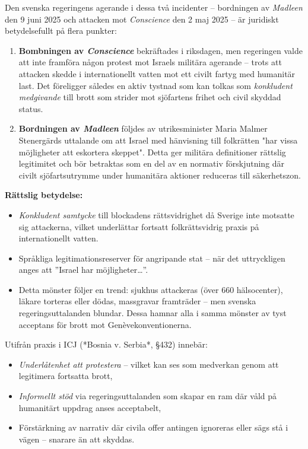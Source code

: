 Den svenska regeringens agerande i dessa två incidenter – bordningen av \textit{Madleen} den 9 juni 2025 och attacken mot \textit{Conscience} den 2 maj 2025 – är juridiskt betydelsefullt på flera punkter:

\begin{enumerate}
  \item \textbf{Bombningen av \textit{Conscience}} bekräftades i riksdagen, men regeringen valde att inte framföra någon protest mot Israels militära agerande – trots att attacken skedde i internationellt vatten mot ett civilt fartyg med humanitär last. Det föreligger således en aktiv tystnad som kan tolkas som \emph{konkludent medgivande} till brott som strider mot sjöfartens frihet och civil skyddad status.
  
  \item \textbf{Bordningen av \textit{Madleen}} följdes av utrikesminister Maria Malmer Stenergärds uttalande om att Israel med hänvisning till folkrätten "har vissa möjligheter att eskortera skeppet". Detta ger militära definitioner rättslig legitimitet och bör betraktas som en del av en normativ förskjutning där civilt sjöfartsutrymme under humanitära aktioner reduceras till säkerhetszon.
\end{enumerate}

\noindent
\textbf{Rättslig betydelse:}
\begin{itemize}
  \item \emph{Konkludent samtycke} till blockadens rättsvidrighet då Sverige inte motsatte sig attackerna, vilket underlättar fortsatt folkrättsvidrig praxis på internationellt vatten.
  \item Språkliga legitimationsreserver för angripande stat – när det uttryckligen anges att ”Israel har möjligheter…”.
  \item Detta mönster följer en trend: sjukhus attackeras (över 660 hälsocenter), läkare torteras eller dödas, massgravar framträder – men svenska regeringsuttalanden blundar. Dessa hamnar alla i samma mönster av tyst acceptans för brott mot Genèvekonventionerna.  
\end{itemize}

\noindent
Utifrån praxis i ICJ (*Bosnia v. Serbia*, §432) innebär:

\begin{itemize}
  \item \emph{Underlåtenhet att protestera} – vilket kan ses som medverkan genom att legitimera fortsatta brott,
  \item \emph{Informellt stöd} via regeringsuttalanden som skapar en ram där våld på humanitärt uppdrag anses acceptabelt,
  \item Förstärkning av narrativ där civila offer antingen ignoreras eller sägs stå i vägen – snarare än att skyddas.
\end{itemize}

